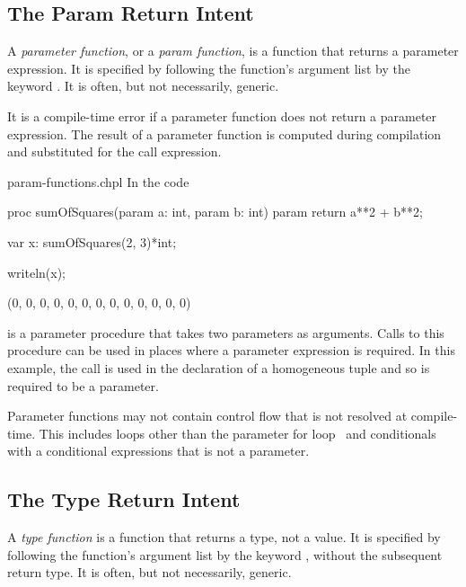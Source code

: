 \subsection{The Param Return Intent}
\label{Param_Return_Intent}

A \emph{parameter function}, or a \emph{param function}, is a function that
returns a parameter expression.  It is specified by following the function's
argument list by the keyword .  It is often, but not necessarily,
generic.

It is a compile-time error if a parameter function does not return a
parameter expression.  The result of a parameter function is computed
during compilation and substituted for the call expression.

\begin{chapelexample}{param-functions.chpl}
In the code
\begin{chapel}
proc sumOfSquares(param a: int, param b: int) param
  return a**2 + b**2;

var x: sumOfSquares(2, 3)*int;
\end{chapel}
\begin{chapelpost}
writeln(x);
\end{chapelpost}
\begin{chapeloutput}
(0, 0, 0, 0, 0, 0, 0, 0, 0, 0, 0, 0, 0)
\end{chapeloutput}
 is a parameter procedure that takes
two parameters as arguments.  Calls to this procedure can be used in
places where a parameter expression is required.  In this example, the
call is used in the declaration of a homogeneous tuple and so is
required to be a parameter.
\end{chapelexample}

Parameter functions may not contain control flow that is not resolved
at compile-time.  This includes loops other than the parameter for
loop~ and conditionals with a conditional
expressions that is not a parameter.


\subsection{The Type Return Intent}
\label{Type_Return_Intent}

A \emph{type function} is a function that returns a type, not a value.  It is
specified by following the function's argument list by the keyword ,
without the subsequent return type.  It is often, but not necessarily, generic.

